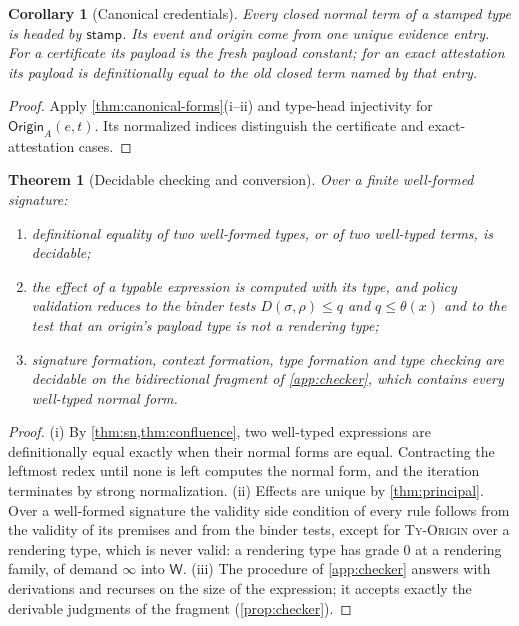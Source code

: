 \documentclass[11pt]{article}
\numberwithin{equation}{section}
\theoremstyle{definition}
\theoremstyle{plain}
\newtheorem{theorem}[definition]{Theorem}
\newtheorem{corollary}[definition]{Corollary}
\theoremstyle{remark}
\newcommand{\Origin}{\mathsf{Origin}}
\newcommand{\Wit}{\mathsf W}
\newcommand{\absent}{\boldsymbol\infty}
\begin{document}
\begin{corollary}[Canonical credentials]\label{cor:credentials}
Every closed normal term of a stamped type is headed by
\(\mathsf{stamp}\).  Its event and origin come from one unique evidence entry.
For a certificate its payload is the fresh payload constant; for an exact
attestation its payload is definitionally equal to the old closed term named
by that entry.
\end{corollary}

\begin{proof}
Apply \cref{thm:canonical-forms}(i--ii) and type-head injectivity for
\(\Origin_A(e,t)\).  Its normalized indices distinguish the certificate and
exact-attestation cases.
\end{proof}

\begin{theorem}[Decidable checking and conversion]\label{thm:decidability}
Over a finite well-formed signature:
\begin{enumerate}[label=(\roman*),leftmargin=2.5em]
\item definitional equality of two well-formed types, or of two well-typed
terms, is decidable;
\item the effect of a typable expression is computed with its type, and
policy validation reduces to the binder tests \(D(\sigma,\rho)\le q\) and
\(q\le\theta(x)\) and to the test that an origin's payload type is not a
rendering type;
\item signature formation, context formation, type formation and type
checking are decidable on the bidirectional fragment of \cref{app:checker},
which contains every well-typed normal form.
\end{enumerate}
\end{theorem}

\begin{proof}
(i) By \cref{thm:sn,thm:confluence}, two well-typed expressions are
definitionally equal exactly when their normal forms are equal.  Contracting
the leftmost redex until none is left computes the normal form, and the
iteration terminates by strong normalization.  (ii) Effects are unique by
\cref{thm:principal}.  Over a well-formed signature the validity side
condition of every rule follows from the validity of its premises and from
the binder tests, except for \textsc{Ty-Origin} over a rendering type, which
is never valid: a rendering type has grade \(0\) at a rendering family, of
demand \(\absent\) into \(\Wit\).  (iii) The procedure
of \cref{app:checker} answers with derivations and recurses on the size of
the expression; it accepts exactly the derivable judgments of the fragment
(\cref{prop:checker}).
\end{proof}
\end{document}
